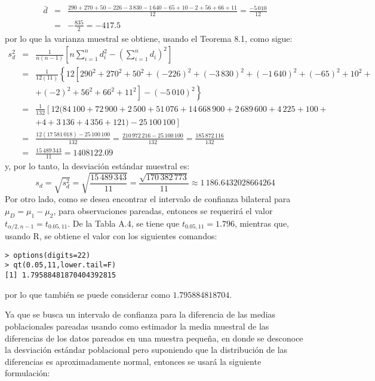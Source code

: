 \begin{solucion}
 \begin{eqnarray*}
  \bar{d} & = & \frac{290 + 270 + 50 -226 -3\,830 -1\,640 -65 + 10 -2 + 56 + 66 + 11}{12} = \frac{-5\,010}{12} \\
  & = & -\frac{835}{2} = -417.5
 \end{eqnarray*}
 por lo que la varianza muestral se obtiene, usando el Teorema 8.1, como sigue:
 \begin{eqnarray*}
  s_d^2 & = & \frac{1}{n(n-1)} \left[ n\sum_{i=1}^n d_i^2 - \left( \sum_{i=1}^n d_i \right)^2 \right] \\
  & = & \frac{1}{12(11)} \left\{ 12\left[ 290^2 + 270^2 + 50^2 + (-226)^2 + (-3\,830)^2 + (-1\,640)^2 + (-65)^2 + 10^2 + \phantom{1} \right. \right. \\
  & & \left. \left. + (-2)^2 + 56^2 + 66^2 + 11^2 \right] - (-5\,010)^2 \right\} \\
  & = & \frac{1}{132} \left[ 12( 84\,100 + 72\,900 + 2\,500 + 51\,076 + 14\,668\,900 + 2\,689\,600 + 4\,225 + 100 + \phantom{1} \right. \\
  & & \left. + 4 + 3\,136 + 4\,356 + 121 ) - 25\,100\,100 \right] \\
  & = & \frac{12(17\,581\,018) - 25\,100\,100}{132} = \frac{210\,972\,216 - 25\,100\,100}{132} = \frac{185\,872\,116}{132} \\
  & = & \frac{15\,489\,343}{11} = 1408122.\overline{09}
 \end{eqnarray*}
 y, por lo tanto, la desviaci\'on est\'andar muestral es:
 \begin{equation*}
  s_d = \sqrt{s_d^2} = \sqrt{\frac{15\,489\,343}{11}} = \frac{\sqrt{170\,382\,773}}{11} \approx 1\,186.6432028664264
 \end{equation*}
 Por otro lado, como se desea encontrar el intervalo de confianza bilateral para $\mu_D = \mu_1 - \mu_2$, para observaciones pareadas, entonces se requerir\'a el valor $t_{\alpha/2,n-1} = t_{0.05,11}$. De la Tabla A.4, se tiene que $t_{0.05,11} = 1.796$, mientras que, usando R, se obtiene el valor  con los siguientes comandos:
 \begin{verbatim}
> options(digits=22)
> qt(0.05,11,lower.tail=F)
[1] 1.79588481870404392815
 \end{verbatim}
 \vspace{-0.5cm}
 por lo que tambi\'en se puede considerar como $1.795884818704$.
 \par 
 Ya que se busca un intervalo de confianza para la diferencia de las medias poblacionales pareadas usando como estimador la media muestral de las diferencias de los datos pareados en una muestra peque\~na, en donde se desconoce la desviaci\'on est\'andar poblacional pero suponiendo que la distribuci\'on de las diferencias es aproximadamente normal, entonces se usar\'a la siguiente formulaci\'on:

\end{solucion}

